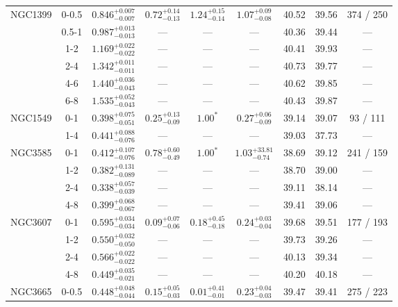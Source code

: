 \documentclass[structabstract]{aa}
\begin{document}
{{\begin{longtable}{lcccccccc}
\hline
NGC1399 & 0-0.5 & $ 0.846 _{- 0.007 }^{+ 0.007 } $ & $  0.72 _{-  0.13 }^{+  0.14 } $ & $  1.24 _{-  0.14 }^{+  0.15 } $ & $  1.07 _{-  0.08 }^{+  0.09 } $ &  40.52 & 39.56 &   374 /   250 \\
 & 0.5-1 & $ 0.987 _{- 0.013 }^{+ 0.013 } $ & --- & --- & --- &  40.36 & 39.44 & --- \\
 & 1-2 & $ 1.169 _{- 0.022 }^{+ 0.022 } $ & --- & --- & --- &  40.41 & 39.93 & --- \\
 & 2-4 & $ 1.342 _{- 0.011 }^{+ 0.011 } $ & --- & --- & --- &  40.73 & 39.77 & --- \\
 & 4-6 & $ 1.440 _{- 0.043 }^{+ 0.036 } $ & --- & --- & --- &  40.62 & 39.85 & --- \\
 & 6-8 & $ 1.535 _{- 0.043 }^{+ 0.052 } $ & --- & --- & --- &  40.43 & 39.87 & --- \\
\hline
NGC1549 & 0-1 & $ 0.398 _{- 0.051 }^{+ 0.075 } $ & $  0.25 _{-  0.09 }^{+  0.13 } $ & $ 1.00^{\ast} $ & $  0.27 _{-  0.09 }^{+  0.06 } $ &  39.14 & 39.07 &    93 /   111 \\
 & 1-4 & $ 0.441 _{- 0.076 }^{+ 0.088 } $ & --- & --- & --- &  39.03 & 37.73 & --- \\
\hline
NGC3585 & 0-1 & $ 0.412 _{- 0.076 }^{+ 0.107 } $ & $  0.78 _{-  0.49 }^{+  0.60 } $ & $ 1.00^{\ast} $ & $  1.03 _{-  0.74 }^{+ 33.81 } $ &  38.69 & 39.12 &   241 /   159 \\
 & 1-2 & $ 0.382 _{- 0.089 }^{+ 0.131 } $ & --- & --- & --- &  38.70 & 39.00 & --- \\
 & 2-4 & $ 0.338 _{- 0.039 }^{+ 0.057 } $ & --- & --- & --- &  39.11 & 38.14 & --- \\
 & 4-8 & $ 0.399 _{- 0.067 }^{+ 0.068 } $ & --- & --- & --- &  39.41 & 39.06 & --- \\
\hline
NGC3607 & 0-1 & $ 0.595 _{- 0.034 }^{+ 0.034 } $ & $  0.09 _{-  0.06 }^{+  0.07 } $ & $  0.18 _{-  0.18 }^{+  0.45 } $ & $  0.24 _{-  0.04 }^{+  0.03 } $ &  39.68 & 39.51 &   177 /   193 \\
 & 1-2 & $ 0.550 _{- 0.050 }^{+ 0.032 } $ & --- & --- & --- &  39.73 & 39.26 & --- \\
 & 2-4 & $ 0.566 _{- 0.022 }^{+ 0.022 } $ & --- & --- & --- &  40.13 & 39.34 & --- \\
 & 4-8 & $ 0.449 _{- 0.021 }^{+ 0.035 } $ & --- & --- & --- &  40.20 & 40.18 & --- \\
\hline
NGC3665 & 0-0.5 & $ 0.448 _{- 0.044 }^{+ 0.048 } $ & $  0.15 _{-  0.03 }^{+  0.05 } $ & $  0.01 _{-  0.01 }^{+  0.41 } $ & $  0.23 _{-  0.03 }^{+  0.04 } $ &  39.47 & 39.41 &   275 /   223 \\

\end{longtable}}}
\end{document}

